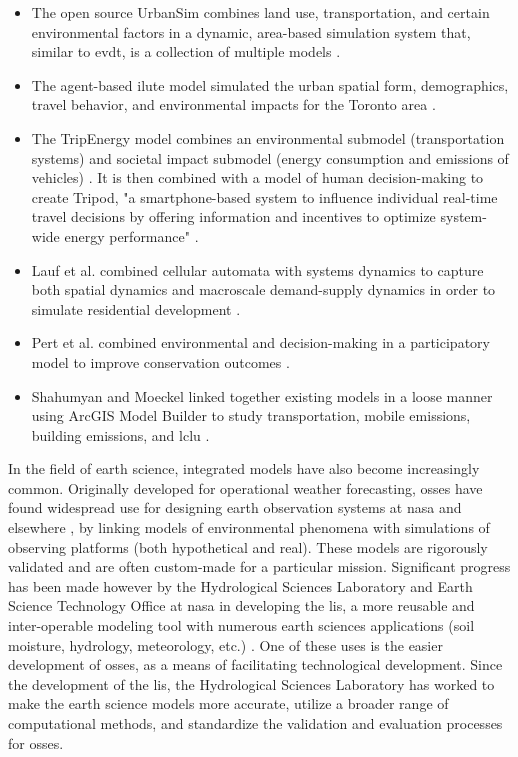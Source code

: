 \begin{itemize} \setlength{\itemsep}{0pt} \setlength{\parskip}{0pt}
	\item{The open source UrbanSim combines land use, transportation, and certain environmental factors in a dynamic, area-based simulation system that, similar to \ac{evdt}, is a collection of multiple models \cite{waddellUrbanSimModelingUrban2002}.}
	\item{The agent-based \ac{ilute} model simulated the urban spatial form, demographics, travel behavior, and environmental impacts for the Toronto area \cite{millerHistoricalValidationIntegrated2011}.}
	\item{The TripEnergy model combines an environmental submodel (transportation systems) and societal impact submodel (energy consumption and emissions of vehicles) \cite{needellEfficientlySimulatingPersonal2018}. It is then combined with a model of human decision-making to create Tripod, "a smartphone-based system to influence individual real-time travel decisions by offering information and incentives to optimize system-wide energy performance" \cite{azevedoTripodSustainableTravel2018}.}
	\item{Lauf et al. combined cellular automata with systems dynamics to capture both spatial dynamics and macroscale demand-supply dynamics in order to simulate residential development \cite{laufUncoveringLanduseDynamics2012}.}
	\item{Pert et al. combined environmental and decision-making in a participatory model to improve conservation outcomes \cite{pertParticipatoryDevelopmentNew2013}.}
	\item{Shahumyan and Moeckel linked together existing models in a loose manner using ArcGIS Model Builder to study transportation, mobile emissions, building emissions, and \ac{lclu} \cite{shahumyanIntegrationLandUse2017}.}
\end{itemize} 

In the field of earth science, integrated models have also become increasingly common. Originally developed for operational weather forecasting, \acp{osse} have found widespread use for designing earth observation systems at \ac{nasa} and elsewhere \cite{masutaniObservingSystemSimulation2010}, by linking models of environmental phenomena with simulations of observing platforms (both hypothetical and real). These models are rigorously validated \cite{erricoDevelopmentValidationObservingsystem2013} and are often custom-made for a particular mission. Significant progress has been made however by the Hydrological Sciences Laboratory and Earth Science Technology Office at \ac{nasa} in developing the \ac{lis}, a more reusable and inter-operable modeling tool with numerous earth sciences applications (soil moisture, hydrology, meteorology, etc.) \cite{kumarMissionSimulationEvaluation2015}. One of these uses is the easier development of \acp{osse}, as a means of facilitating technological development. Since the development of the \ac{lis}, the Hydrological Sciences Laboratory has worked to make the earth science models more accurate, utilize  a broader range of computational methods, and standardize the validation and evaluation processes for \acp{osse}.


